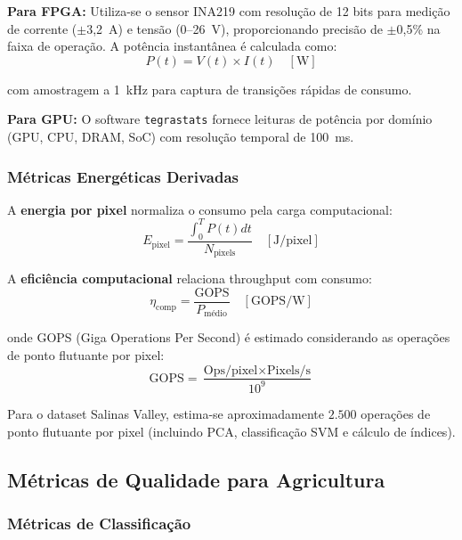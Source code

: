 \textbf{Para FPGA:} Utiliza-se o sensor INA219 com resolução de 12 bits para 
medição de corrente ($\pm$3,2~A) e tensão (0--26~V), proporcionando precisão de 
$\pm$0,5\% na faixa de operação. A potência instantânea é calculada como:
\begin{equation}
P(t) = V(t) \times I(t) \quad [\text{W}]
\label{eq:potencia_instantanea}
\end{equation}

com amostragem a 1~kHz para captura de transições rápidas de consumo.

\textbf{Para GPU:} O software \texttt{tegrastats} fornece leituras de potência 
por domínio (GPU, CPU, DRAM, SoC) com resolução temporal de 100~ms.

\subsubsection{Métricas Energéticas Derivadas}

A \textbf{energia por pixel} normaliza o consumo pela carga computacional:
\begin{equation}
E_{\text{pixel}} = \frac{\int_0^{T} P(t) dt}{N_{\text{pixels}}} \quad [\text{J/pixel}]
\label{eq:energia_pixel}
\end{equation}

A \textbf{eficiência computacional} relaciona throughput com consumo:
\begin{equation}
\eta_{\text{comp}} = \frac{\text{GOPS}}{P_{\text{médio}}} \quad [\text{GOPS/W}]
\label{eq:eficiencia_computacional}
\end{equation}

onde GOPS (Giga Operations Per Second) é estimado considerando as operações 
de ponto flutuante por pixel:
\begin{equation}
\text{GOPS} = \frac{\text{Ops/pixel} \times \text{Pixels/s}}{10^9}
\label{eq:gops}
\end{equation}

Para o dataset Salinas Valley, estima-se aproximadamente $2{.}500$ operações de 
ponto flutuante por pixel (incluindo PCA, classificação SVM e cálculo de índices).

\subsection{Métricas de Qualidade para Agricultura}\label{subsec:metricas_qualidade}

\subsubsection{Métricas de Classificação}

